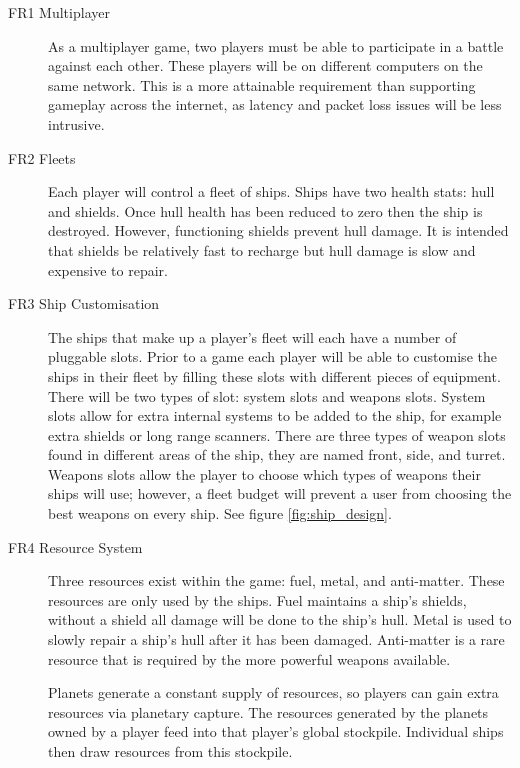 \begin{description}

	\item[FR1 Multiplayer] As a multiplayer game, two players must be able to participate in a battle against each other.
	These players will be on different computers on the same network. This is a more attainable requirement than supporting gameplay across the internet, as latency and packet loss issues will be less intrusive.

	\item[FR2 Fleets] Each player will control a fleet of ships. Ships have two health stats: hull and shields. Once hull health has been reduced to zero then the ship is destroyed. However, functioning shields prevent hull damage. It is intended that shields be relatively fast to recharge but hull damage is slow and expensive to repair.

	\item[FR3 Ship Customisation] The ships that make up a player's fleet will each have a number of pluggable slots. Prior to a game each player will be able to customise the ships in their fleet by filling these slots with different pieces of equipment. There will be two types of slot: system slots and weapons slots. System slots allow for extra internal systems to be added to the ship, for example extra shields or long range scanners. There are three types of weapon slots found in different areas of the ship, they are named front, side, and turret. Weapons slots allow the player to choose which types of weapons their ships will use; however, a fleet budget will prevent a user from choosing the best weapons on every ship. See figure \ref{fig:ship_design}.

	\item[FR4 Resource System] Three resources exist within the game: fuel, metal, and anti-matter. These resources are only used by the ships. Fuel maintains a ship's shields, without a shield all damage will be done to the ship's hull. Metal is used to slowly repair a ship's hull after it has been damaged. Anti-matter is a rare resource that is required by the more powerful weapons available.

	Planets generate a constant supply of resources, so players can gain extra resources via planetary capture. The resources generated by the planets owned by a player feed into that player's global stockpile. Individual ships then draw resources from this stockpile.



\end{description}
